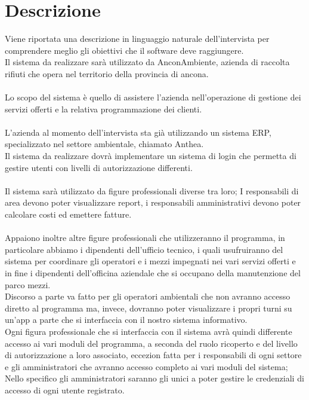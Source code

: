 \documentclass[green, fancy, 11pt]{elegantbook}
\begin{document}
\newpage

\section{Descrizione}
Viene riportata una descrizione in linguaggio naturale dell'intervista per comprendere meglio gli obiettivi che il software deve raggiungere.
\\
Il sistema da realizzare sarà utilizzato da AnconAmbiente, azienda di raccolta rifiuti che opera nel territorio della provincia di ancona.\\
\\
Lo scopo del sistema è quello di assistere l’azienda nell’operazione di gestione dei servizi offerti e la relativa programmazione dei clienti.\\
\\
L’azienda al momento dell’intervista sta già utilizzando un sistema ERP, specializzato nel settore ambientale, chiamato Anthea.\\
Il sistema da realizzare dovrà implementare un sistema di login che permetta di gestire utenti con livelli di autorizzazione differenti.\\
\\
Il sistema sarà utilizzato da figure professionali diverse tra loro; I responsabili di area devono poter visualizzare report, i responsabili amministrativi devono poter calcolare costi ed emettere fatture.\\
\\
Appaiono inoltre altre figure professionali che utilizzeranno il programma, in particolare abbiamo i dipendenti dell’ufficio tecnico, i quali usufruiranno del sistema per coordinare gli operatori e i mezzi impegnati nei vari servizi offerti e in fine i dipendenti dell’officina aziendale che si occupano della manutenzione del parco mezzi.\\
Discorso a parte va fatto per gli operatori ambientali che non avranno accesso diretto al programma ma, invece, dovranno poter visualizzare i propri turni su un’app a parte che si interfaccia con il nostro sistema informativo.\\
Ogni figura professionale che si interfaccia con il sistema avrà quindi differente accesso ai vari moduli del programma, a seconda del ruolo ricoperto e del livello di autorizzazione a loro associato, eccezion fatta per i responsabili di ogni settore e gli amministratori che avranno accesso completo ai vari moduli del sistema; Nello specifico gli amministratori saranno gli unici a poter gestire le credenziali di accesso di ogni utente registrato.\\
\end{document}
